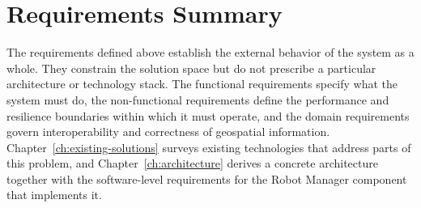 \section{Requirements Summary} \label{sec:requirements-summary}

The requirements defined above establish the external behavior of the system as a whole. They constrain the solution space but do not prescribe a particular architecture or technology stack. The functional requirements specify what the system must do, the non-functional requirements define the performance and resilience boundaries within which it must operate, and the domain requirements govern interoperability and correctness of geospatial information. Chapter~\ref{ch:existing-solutions} surveys existing technologies that address parts of this problem, and Chapter~\ref{ch:architecture} derives a concrete architecture together with the software-level requirements for the Robot Manager component that implements it.
